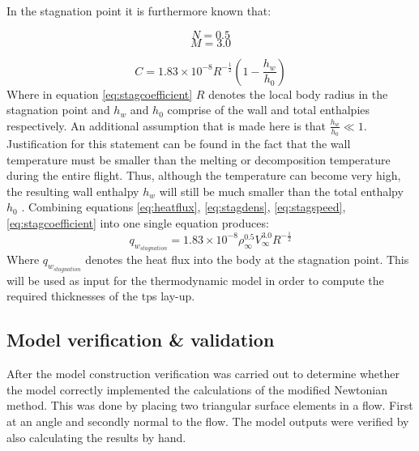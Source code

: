 In the stagnation point it is furthermore known that: 
\begin{multicols}{2}
\begin{equation}
\label{eq:stagdens}
N=0.5
\end{equation} \break
\begin{equation}
\label{eq:stagspeed}
M=3.0
\end{equation}
\end{multicols}
\begin{equation}
\label{eq:stagcoefficient}
C=1.83 \times 10^{-8} R^{-\frac{1}{2}}\left(1-\frac{h_{w}}{h_{0}}\right)
\end{equation}
Where in equation \ref{eq:stagcoefficient} $R$ denotes the local body radius in the stagnation point and $h_{w}$ and $h_{0}$ comprise of the wall and total enthalpies respectively. An additional assumption that is made here is that $\frac{h_{w}}{h_{0}}\ll 1$. Justification for this statement can be found in the fact that the wall temperature must be smaller than the melting or decomposition temperature during the entire flight. Thus, although the temperature can become very high, the resulting wall enthalpy $h_{w}$ will still be much smaller than the total enthalpy $h_{0}$ \cite[p.347]{AndersonJr.2006}. %
Combining equations \ref{eq:heatflux}, \ref{eq:stagdens}, \ref{eq:stagspeed}, \ref{eq:stagcoefficient} into one single equation produces:
\begin{equation}
q_{w_{stagnation}}=1.83 \times 10^{-8}\rho_{\infty}^{0.5} V_{\infty}^{3.0} R^{-\frac{1}{2}}
\label{eq:qstag}
\end{equation}
Where $q_{w_{stagnation}}$ denotes the heat flux into the body at the stagnation point. This will be used as input for the thermodynamic model in order to compute the required thicknesses of the \acrfull{tps} lay-up.

\subsection{Model verification \& validation}
\label{subsec:aeroverval}
After the model construction verification was carried out to determine whether the model correctly implemented the calculations of the modified Newtonian method. This was done by placing two triangular surface elements in a flow. First at an angle and secondly normal to the flow. The model outputs were verified by also calculating the results by hand.

